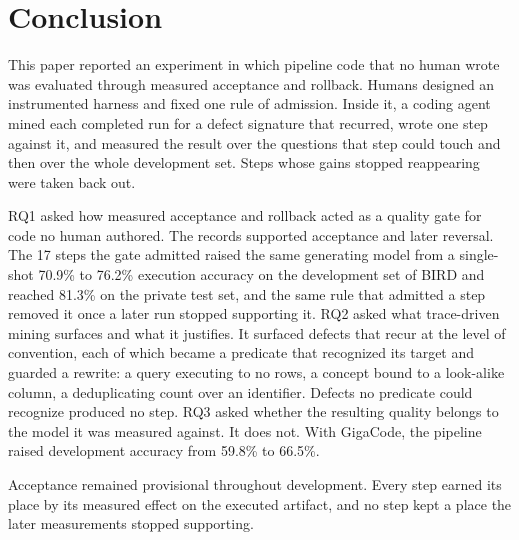\section{Conclusion}

This paper reported an experiment in which pipeline code that no human wrote
was evaluated through measured acceptance and rollback. Humans designed an instrumented harness and
fixed one rule of admission. Inside it, a coding agent mined each completed run
for a defect signature that recurred, wrote one step against it, and measured
the result over the questions that step could touch and then over the whole
development set. Steps whose gains stopped reappearing were taken back out.

RQ1 asked how measured acceptance and rollback acted as a quality gate
for code no human authored. The records supported acceptance and later reversal. The 17 steps the gate admitted
raised the same generating model from a single-shot 70.9\% to 76.2\% execution
accuracy on the development set of BIRD and reached 81.3\% on the private test
set, and the
same rule that admitted a step removed it once a later run stopped supporting
it. RQ2 asked what trace-driven mining surfaces and what it justifies. It
surfaced defects that recur at the level of convention, each of which became a
predicate that recognized its target and guarded a rewrite: a query executing
to no rows, a concept bound to a look-alike column, a deduplicating count over an
identifier. Defects no predicate could recognize produced no step.
RQ3 asked whether the resulting quality belongs to the model it was measured
against. It does not. With GigaCode, the pipeline raised development accuracy from 59.8\% to
66.5\%.

Acceptance remained provisional throughout development. Every step earned its place by its measured effect on the executed
artifact, and no step kept a place the later measurements stopped supporting.
